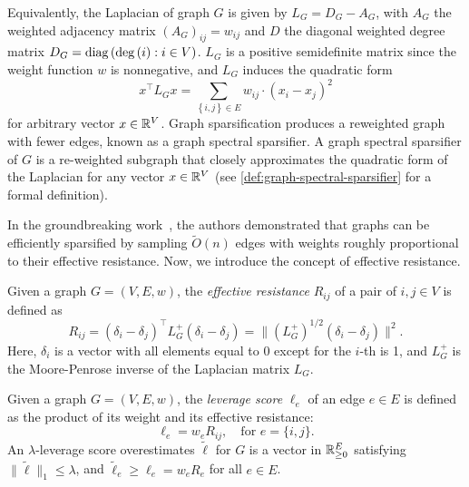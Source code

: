 \documentclass[11pt]{article}
\newcommand{\norms}[1]{\lVert #1 \rVert}
\newcommand{\paren}[1]{\left( #1 \right)}
\newcommand{\parens}[1]{( #1 )}
\newcommand{\set}[1]{\left\{ #1 \right\}}
\begin{document}
{Equivalently, the Laplacian of graph $G$ is given by $L _G= D _G-A _G$, with $A_G$ the
weighted adjacency matrix $\paren{A_G}_{ij}=w _{ij}$ and $D$ the diagonal
weighted degree matrix $D_G=\diag\paren{\deg\paren{i}: i \in V}$. $L_G$ is a
positive semidefinite matrix since the weight function $w$ is nonnegative, and $L_G$ induces the quadratic form
\begin{equation*}\label{eq:quadratic-laplacian}
x ^\top L_ G  x=\sum_{\set {i,j}\in  E}w _{ij}\cdot \parens{x_i -x_j}^2
\end{equation*}
for  arbitrary vector $x \in \mathbb{R}^V$.
Graph sparsification produces a reweighted graph with fewer edges, known as a graph spectral sparsifier.
A graph spectral sparsifier of $G$ is a re-weighted subgraph that closely approximates the quadratic form of the Laplacian for any vector $x\in \mathbb{R}^V$
(see \cref{def:graph-spectral-sparsifier} for a formal definition).


In the groundbreaking work~\cite{SS11}, the authors
demonstrated that graphs can be efficiently sparsified by sampling $\widetilde O(n)$ edges with
weights roughly proportional to their effective resistance. Now, we introduce the concept of
effective resistance.

\begin{definition}
	Given a graph $G =\parens {V,E,w}$, the \emph{effective resistance} $R_{ij}$ of a pair of $i , j \in V $ is defined as
	\begin{equation*}
		R_ {ij }=\parens {\delta_i -\delta_j }^\top L_G ^{+}\parens {\delta_i -\delta_j }= \norms {(L_G^+)^{1/2} \parens {\delta_i -\delta_j }}^2.
	\end{equation*}
	Here, $\delta_i$ is a vector with all elements equal to 0 except for the $i$-th is 1, and $L^{+}_G$ is the Moore-Penrose inverse of the Laplacian matrix $L_G$. 
\end{definition}
\begin{definition}
	Given a graph $G =\parens {V,E,w}$, the \emph{leverage score} $\ell_e$ of an edge  $e \in E$  is defined as the product of its weight and its effective resistance:
\begin{equation*}
\ell_e = w_e R_{ij}, \quad \text{for } e = \{i, j\}.
\end{equation*}
    An $\lambda$-leverage score overestimates
    $\widetilde\ell$ for $G$
    is a vector in $\mathbb{R}^E_{\geq 0}$
    satisfying $\norms{\widetilde \ell}_1\leq \lambda$,
    and $\widetilde\ell_e\geq \ell_e= w_e R_e$ for all $e\in E$.
\end{definition}

}
\end{document}
